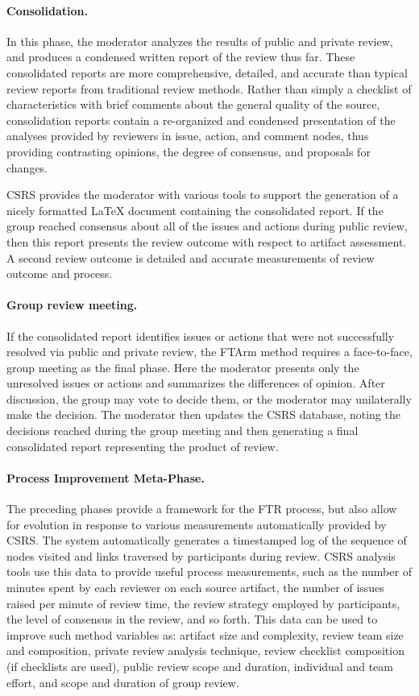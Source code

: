 \paragraph{Consolidation.} In this phase, the moderator analyzes the results of
public and private review, and produces a condensed written report of the
review thus far.  These consolidated reports are more
comprehensive, detailed, and accurate than typical review reports from
traditional review methods. Rather than simply a checklist of
characteristics with brief comments about the general quality of the
source, consolidation reports contain a re-organized and condensed
presentation of the analyses provided by reviewers in issue, action, and
comment nodes, thus providing contrasting opinions, the degree of
consensus, and proposals for changes.

CSRS provides the moderator with various tools to support the generation of
a nicely formatted LaTeX document containing the consolidated report.  If
the group reached consensus about all of the issues and actions during
public review, then this report presents the review outcome with respect to
artifact assessment.  A second review outcome is detailed and accurate
measurements of review outcome and process.
 
\paragraph {Group review meeting.} If the consolidated report 
identifies issues or actions that were not successfully resolved via
public and private review, the FTArm method requires a face-to-face,
group meeting as the final phase.  Here the moderator presents only
the unresolved issues or actions and summarizes the differences of
opinion.  After discussion, the group may vote to decide them, or the
moderator may unilaterally make the decision. The moderator then
updates the CSRS database, noting the decisions reached during the
group meeting and then generating a final consolidated report
representing the product of review.

\paragraph{Process Improvement Meta-Phase.}
The preceding phases provide a framework for the FTR process, but also
allow for evolution in response to various measurements automatically
provided by CSRS.  The system automatically generates a timestamped log of
the sequence of nodes visited and links traversed by participants during
review. CSRS analysis tools use this data to provide useful process
measurements, such as the number of minutes spent by each reviewer on each
source artifact, the number of issues raised per minute of review time, the
review strategy employed by participants, the level of consensus in the
review, and so forth.  This data can be used to improve such method
variables as: artifact size and complexity, review team size and
composition, private review analysis technique, review checklist
composition (if checklists are used), public review scope and duration,
individual and team effort, and scope and duration of group review.

